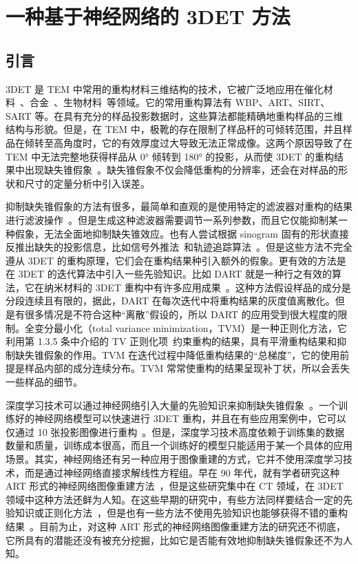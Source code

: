 \let\origdoublepage\cleardoublepage
\newcommand{\clearemptydoublepage}{
	\clearpage
	{\pagestyle{empty}\origdoublepage}
}
\clearemptydoublepage
\chapter{一种基于神经网络的 3DET 方法}
\section{引言}
3DET 是 TEM 中常用的重构材料三维结构的技术，它被广泛地应用在催化材料~\cite{Weyland2002}、合金~\cite{Yang2014,Malladi2014,YuXW2020}、生物材料~\cite{Dahlberg2020}等领域。它的常用重构算法有 WBP、ART、SIRT、SART 等。在具有充分的样品投影数据时，这些算法都能精确地重构样品的三维结构与形貌。但是，在 TEM 中，极靴的存在限制了样品杆的可倾转范围，并且样品在倾转至高角度时，它的有效厚度过大导致无法正常成像。这两个原因导致了在 TEM 中无法完整地获得样品从 0° 倾转到 180° 的投影，从而使 3DET 的重构结果中出现缺失锥假象~\cite{Paavolainen2014,Gontard2015}。缺失锥假象不仅会降低重构的分辨率，还会在对样品的形状和尺寸的定量分析中引入误差。

抑制缺失锥假象的方法有很多，最简单和直观的是使用特定的滤波器对重构的结果进行滤波操作~\cite{Kovacik2014}。但是生成这种滤波器需要调节一系列参数，而且它仅能抑制某一种假象，无法全面地抑制缺失锥效应。也有人尝试根据 sinogram 固有的形状直接反推出缺失的投影信息，比如信号外推法~\cite{Yau1996}和轨迹追踪算法~\cite{Kupsch2015}。但是这些方法不完全遵从 3DET 的重构原理，它们会在重构结果种引入额外的假象。更有效的方法是在 3DET 的迭代算法中引入一些先验知识。比如 DART 就是一种行之有效的算法，它在纳米材料的 3DET 重构中有许多应用成果~\cite{Batenburg2009,Bals2007,Biermans2010,Bals2009,Zurner2009,Zhuge2017}。这种方法假设样品的成分是分段连续且有限的，据此，DART 在每次迭代中将重构结果的灰度值离散化。但是有很多情况是不符合这种“离散”假设的，所以 DART 的应用受到很大程度的限制。全变分最小化（total variance minimization，TVM）是一种正则化方法，它利用第 1.3.5 条中介绍的 TV 正则化项~\cite{Persson2001,Rudin1996,Goris1996,Jiang2018}约束重构的结果，具有平滑重构结果和抑制缺失锥假象的作用。TVM 在迭代过程中降低重构结果的“总梯度”，它的使用前提是样品内部的成分连续分布。TVM 常常使重构的结果呈现补丁状，所以会丢失一些样品的细节。

深度学习技术可以通过神经网络引入大量的先验知识来抑制缺失锥假象~\cite{Ding2019,Pelt2013,Bladt2015,YangF2020}。一个训练好的神经网络模型可以快速进行 3DET 重构，并且在有些应用案例中，它可以仅通过 10 张投影图像进行重构~\cite{Bladt2015}。但是，深度学习技术高度依赖于训练集的数据数量和质量，训练成本很高，而且一个训练好的模型只能适用于某一个具体的应用场景。其实，神经网络还有另一种应用于图像重建的方式，它并不使用深度学习技术，而是通过神经网络直接求解线性方程组。早在 90 年代，就有学者研究这种 ART 形式的神经网络图像重建方法~\cite{Srinivasan1993,Ma2000,Deming1998,Cichocki1995,Wang2006,Teranishi2016}，但是这些研究集中在 CT 领域，在 3DET 领域中这种方法还鲜为人知。在这些早期的研究中，有些方法同样要结合一定的先验知识或正则化方法~\cite{Deming1998,Cichocki1995,Wang2006,Teranishi2016}，但是也有一些方法不使用先验知识也能够获得不错的重构结果~\cite{Srinivasan1993,Ma2000}。目前为止，对这种 ART 形式的神经网络图像重建方法的研究还不彻底，它所具有的潜能还没有被充分挖掘，比如它是否能有效地抑制缺失锥假象还不为人知。

